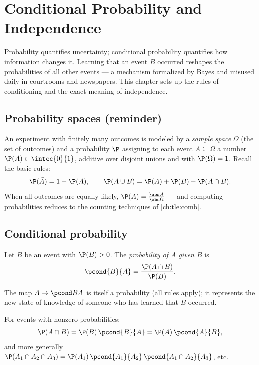 \chapter{Conditional Probability and Independence}\label{ch:tle:condprob}

Probability quantifies uncertainty; conditional probability quantifies how
information changes it. Learning that an event $B$ occurred reshapes the
probabilities of all other events --- a mechanism formalized by Bayes and
misused daily in courtrooms and newspapers. This chapter sets up the rules
of conditioning and the exact meaning of independence.

\section{Probability spaces (reminder)}

An experiment with finitely many outcomes is modeled by a \emph{sample
space} $\Omega$ (the set of outcomes) and a probability $\P$ assigning to
each event $A \subseteq \Omega$ a number $\P(A) \in \intcc{0}{1}$, additive
over disjoint unions and with $\P(\Omega) = 1$. Recall the basic rules:
\[
\P(\bar A) = 1 - \P(A),
\qquad
\P(A \cup B) = \P(A) + \P(B) - \P(A \cap B).
\]
When all outcomes are equally likely,
$\P(A) = \frac{\abs A}{\abs\Omega}$ --- and computing probabilities reduces
to the counting techniques of \cref{ch:tle:comb}.

\section{Conditional probability}

\begin{definition}\label{def:tle:condprob:cond}
Let $B$ be an event with $\P(B) > 0$. The \emph{probability of $A$ given
$B$} is
\[
\pcond{B}{A} = \frac{\P(A \cap B)}{\P(B)} .
\]
\end{definition}

The map $A \mapsto \pcond BA$ is itself a probability (all rules apply); it
represents the new state of knowledge of someone who has learned that $B$
occurred.

\begin{proposition}\label{prop:tle:condprob:product}
For events with nonzero probabilities:
\[
\P(A \cap B) = \P(B)\,\pcond{B}{A} = \P(A)\,\pcond{A}{B},
\]
and more generally
$\P(A_1 \cap A_2 \cap A_3) = \P(A_1)\,\pcond{A_1}{A_2}\,
\pcond{A_1 \cap A_2}{A_3}$, etc.
\end{proposition}

